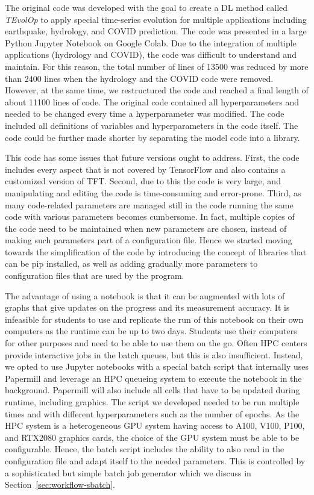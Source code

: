 \documentclass[utf8]{FrontiersinVancouver} %
\begin{document}
The original code was developed with the goal to create a DL method called {\em TEvolOp} to apply special time-series evolution for multiple applications including earthquake, hydrology, and COVID prediction. The code was presented in a large Python Jupyter Notebook on Google Colab.  Due to the integration of multiple applications (hydrology and COVID), the code was difficult to understand and maintain. For this reason, the total number of lines of 13500 was reduced by more than 2400 lines when the hydrology and the COVID code were removed. However, at the same time, we restructured the code and reached a final length of about 11100 lines of code. The original code contained all hyperparameters and needed to be changed every time a hyperparameter was modified.  The code included all definitions of variables and hyperparameters in the code itself. The code could be further made shorter by separating the model code into a library.

This code has some issues that future versions ought to address. First, the code includes every aspect that is not covered by TensorFlow and also contains a customized version of TFT. Second, due to this the code is very large, and manipulating and editing the code is time-consuming and error-prone. Third, as many code-related parameters are managed still in the code running the same code with various parameters becomes cumbersome. In fact, multiple copies of the code need to be maintained when new parameters are chosen, instead of making such parameters part of a configuration file. Hence we started moving towards the simplification of the code by introducing the concept of libraries that can be pip installed, as well as adding gradually more parameters to configuration files that are used by the program.

The advantage of using a notebook is that it can be augmented with lots of graphs that give updates on the progress and its measurement accuracy. It is infeasible for students to use and replicate the run of this notebook on their own computers as the runtime can be up to two days. Students use their computers for other purposes and need to be able to use them on the go. Often HPC centers provide interactive jobs in the batch queues, but this is also insufficient. Instead, we opted to use Jupyter notebooks with a special batch script that internally uses Papermill \citep{www-papermill} and leverage an HPC queueing system to execute the notebook in the background. Papermill will also include all cells that have to be updated during runtime, including graphics. The script we developed needed to be run multiple times and with different hyperparameters such as the number of epochs.  As the HPC system is a heterogeneous GPU system having access to A100, V100, P100, and RTX2080 graphics cards, the choice of the GPU system must be able to be configurable. Hence, the batch script includes the ability to also read in the configuration file and adapt itself to the needed parameters. This is controlled by a sophisticated but simple batch job generator which we discuss in Section~\ref{sec:workflow-sbatch}.
\end{document}
